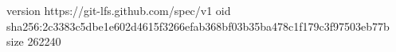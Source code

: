 version https://git-lfs.github.com/spec/v1
oid sha256:2c3383c5dbe1e602d4615f3266efab368bf03b35ba478c1f179c3f97503eb77b
size 262240
